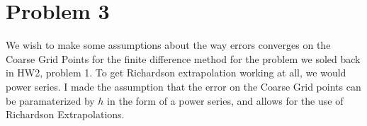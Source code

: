 \documentclass[]{article}
\begin{document}
\section*{Problem 3}
    We wish to make some assumptions about the way errors converges on the Coarse Grid Points for the finite difference method for the problem we soled back in HW2, problem 1. To get Richardson extrapolation working at all, we would power series. I made the assumption that the error on the Coarse Grid points can be paramaterized by $h$ in the form of a power series, and allows for the use of Richardson Extrapolations. 
    \\
    
\end{document}
